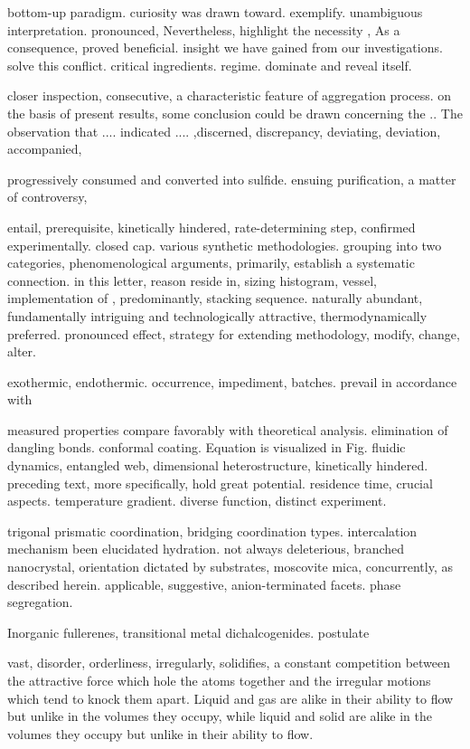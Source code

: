 bottom-up paradigm. curiosity was drawn toward. exemplify. unambiguous interpretation. pronounced, Nevertheless, highlight the necessity , As a consequence, proved beneficial. insight we have gained from our investigations. solve this conflict. critical ingredients. regime. dominate and reveal itself. 

closer inspection, consecutive, a characteristic feature of aggregation process. on the basis of present results, some conclusion could be drawn concerning the .. The observation that .... indicated .... ,discerned, discrepancy, deviating, deviation, accompanied, 

progressively consumed and converted into sulfide. ensuing purification, a matter of controversy, 

entail, prerequisite, kinetically hindered, rate-determining step, confirmed experimentally. closed cap. various synthetic methodologies.
grouping into two categories, phenomenological arguments, primarily, establish a systematic connection. 
in this letter, reason reside in, sizing histogram, vessel, implementation of , predominantly, stacking sequence.
naturally abundant, fundamentally intriguing and technologically attractive, thermodynamically preferred. 
pronounced effect, strategy for extending methodology, modify, change, alter. 

exothermic, endothermic. occurrence, impediment, batches. prevail in accordance with 

measured properties compare favorably with theoretical analysis. 
elimination of dangling bonds. conformal coating. Equation is visualized in Fig.
fluidic dynamics, entangled web, dimensional heterostructure, kinetically hindered. preceding text, more specifically, hold great potential. 
residence time, crucial aspects. temperature gradient. diverse function, distinct experiment. 

trigonal prismatic coordination, bridging coordination types. intercalation mechanism been elucidated 
hydration. not always deleterious, branched nanocrystal, orientation dictated by substrates, moscovite mica, concurrently, as described herein. applicable, suggestive, anion-terminated facets. phase segregation. 

Inorganic fullerenes, transitional metal dichalcogenides. postulate 

vast, disorder, orderliness, irregularly, solidifies, 
a constant competition between the attractive force which hole the atoms together and the irregular motions which tend to knock them apart. 
Liquid and gas are alike in their ability to flow but unlike in the volumes they occupy, while liquid and solid are alike in the volumes they occupy but unlike in their ability to flow. 

